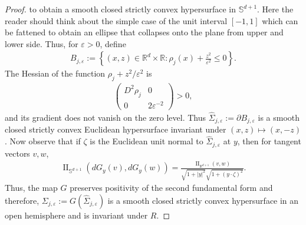 \documentclass[11pt,reqno]{amsart}
\numberwithin{equation}{section}
\theoremstyle{definition}
\theoremstyle{remark}
\def\bR {\mathbb{R}}
\def\bS {\mathbb{S}}
\newcommand{\0}{\emptyset}
\newcommand{\veps}{\varepsilon}
\begin{document}
\begin{proof}
to obtain a smooth closed strictly convex hypersurface in $\bS^{d+1}$. Here the reader should think about the simple case of the unit interval $[-1,1]$ which can be fattened to obtain an ellipse that collapses onto the plane from upper and lower side. Thus, for $\varepsilon>0$, define
\begin{align}
        B_{j,\varepsilon}
        :=
        \left\{
        (x,z)\in\bR^d\times\bR:
        \rho_j(x)+\frac{z^2}{\varepsilon^2}\leq0
        \right\}.
\end{align}
The Hessian of the function $\rho_j+z^2/\veps^2$ is
\begin{align}
        \begin{pmatrix}
        D^2\rho_j&0\\
        0&2\varepsilon^{-2}
        \end{pmatrix}
        >
        0,
\end{align}
and its gradient does not vanish on the zero level. Thus
$\widehat\Sigma_{j,\varepsilon}:=\partial B_{j,\varepsilon}$ is a smooth
closed strictly convex Euclidean hypersurface invariant under
$(x,z)\mapsto(x,-z)$. Now observe that if $\zeta$ is the Euclidean unit normal to
$\widehat\Sigma_{j,\varepsilon}$ at $y$, then for tangent vectors $v,w$,
\begin{align}
        \operatorname{II}_{\bS^{d+1}}(dG_y(v),dG_y(w))
        =
        \frac{
        \operatorname{II}_{\bR^{d+1}}(v,w)
        }{
        \sqrt{1+|y|^2}
        \sqrt{1+(y\cdot\zeta)^2}
        }.
\end{align}
Thus, the map $G$ preserves positivity of the second fundamental form and therefore, $\Sigma_{j,\varepsilon} := G(\widehat\Sigma_{j,\varepsilon})$ is a smooth closed strictly convex hypersurface in an open hemisphere and is
invariant under $R$.


\end{proof}
\end{document}
